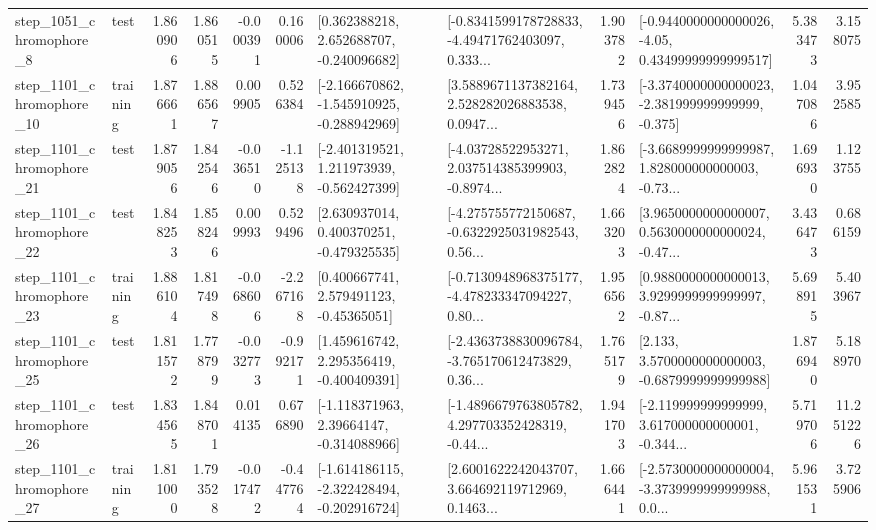 \begin{tabular}{llrrrrllrlrr}
  step\_1051\_chromophore\_8 &      test &      1.860906 &    1.860515 &     -0.000391 &  0.160006 &    [0.362388218, 2.652688707, -0.240096682] &  [-0.8341599178728833, -4.49471762403097, 0.333... &       1.903782 &  [-0.9440000000000026, -4.05, 0.43499999999999517] &            5.383473 &          3.158075 \\
 step\_1101\_chromophore\_10 &  training &      1.876661 &    1.886567 &      0.009905 &  0.526384 &  [-2.166670862, -1.545910925, -0.288942969] &  [3.5889671137382164, 2.528282026883538, 0.0947... &       1.739456 &  [-3.3740000000000023, -2.381999999999999, -0.375] &            1.047086 &          3.952585 \\
 step\_1101\_chromophore\_21 &      test &      1.879056 &    1.842546 &     -0.036510 & -1.125138 &   [-2.401319521, 1.211973939, -0.562427399] &  [-4.03728522953271, 2.037514385399903, -0.8974... &       1.862824 &  [-3.6689999999999987, 1.828000000000003, -0.73... &            1.696930 &          1.123755 \\
 step\_1101\_chromophore\_22 &      test &      1.848253 &    1.858246 &      0.009993 &  0.529496 &    [2.630937014, 0.400370251, -0.479325535] &  [-4.275755772150687, -0.6322925031982543, 0.56... &       1.663203 &  [3.9650000000000007, 0.5630000000000024, -0.47... &            3.436473 &          0.686159 \\
 step\_1101\_chromophore\_23 &  training &      1.886104 &    1.817498 &     -0.068606 & -2.267168 &     [0.400667741, 2.579491123, -0.45365051] &  [-0.7130948968375177, -4.478233347094227, 0.80... &       1.956562 &  [0.9880000000000013, 3.9299999999999997, -0.87... &            5.698915 &          5.403967 \\
 step\_1101\_chromophore\_25 &      test &      1.811572 &    1.778799 &     -0.032773 & -0.992171 &    [1.459616742, 2.295356419, -0.400409391] &  [-2.4363738830096784, -3.765170612473829, 0.36... &       1.765179 &   [2.133, 3.5700000000000003, -0.6879999999999988] &            1.876940 &          5.188970 \\
 step\_1101\_chromophore\_26 &      test &      1.834565 &    1.848701 &      0.014135 &  0.676890 &    [-1.118371963, 2.39664147, -0.314088966] &  [-1.4896679763805782, 4.297703352428319, -0.44... &       1.941703 &  [-2.119999999999999, 3.617000000000001, -0.344... &            5.719706 &         11.251226 \\
 step\_1101\_chromophore\_27 &  training &      1.811000 &    1.793528 &     -0.017472 & -0.447764 &  [-1.614186115, -2.322428494, -0.202916724] &  [2.6001622242043707, 3.664692119712969, 0.1463... &       1.666441 &  [-2.5730000000000004, -3.3739999999999988, 0.0... &            5.961531 &          3.725906 \\

\end{tabular}
